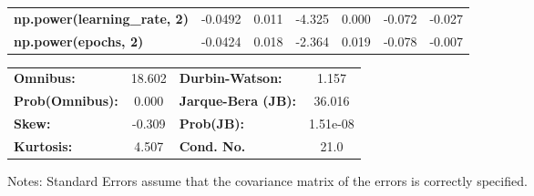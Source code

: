 \begin{center}
\begin{tabular}{lcccccc}
\textbf{np.power(learning\_rate, 2)} &      -0.0492  &        0.011     &    -4.325  &         0.000        &       -0.072    &       -0.027     \\
\textbf{np.power(epochs, 2)}         &      -0.0424  &        0.018     &    -2.364  &         0.019        &       -0.078    &       -0.007     \\
\bottomrule
\end{tabular}
\begin{tabular}{lclc}
\textbf{Omnibus:}       & 18.602 & \textbf{  Durbin-Watson:     } &    1.157  \\
\textbf{Prob(Omnibus):} &  0.000 & \textbf{  Jarque-Bera (JB):  } &   36.016  \\
\textbf{Skew:}          & -0.309 & \textbf{  Prob(JB):          } & 1.51e-08  \\
\textbf{Kurtosis:}      &  4.507 & \textbf{  Cond. No.          } &     21.0  \\
\bottomrule
\end{tabular}
\end{center}

Notes: \newline
 [1] Standard Errors assume that the covariance matrix of the errors is correctly specified.